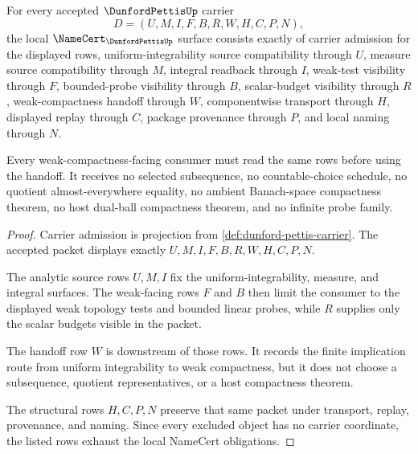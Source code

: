 \begin{theorem}
\label{thm:dunford-pettis-namecert-obligations}
For every accepted $\DunfordPettisUp$ carrier
$$
D=(U,M,I,F,B,R,W,H,C,P,N),
$$
the local $\NameCert_{\DunfordPettisUp}$ surface consists exactly of carrier admission for the displayed rows, uniform-integrability source compatibility through $U$, measure source compatibility through $M$, integral readback through $I$, weak-test visibility through $F$, bounded-probe visibility through $B$, scalar-budget visibility through $R$, weak-compactness handoff through $W$, componentwise transport through $H$, displayed replay through $C$, package provenance through $P$, and local naming through $N$.

Every weak-compactness-facing consumer must read the same rows before using the handoff. It receives no selected subsequence, no countable-choice schedule, no quotient almost-everywhere equality, no ambient Banach-space compactness theorem, no host dual-ball compactness theorem, and no infinite probe family.
\end{theorem}
\begin{proof}
Carrier admission is projection from \autoref{def:dunford-pettis-carrier}. The accepted packet displays exactly $U,M,I,F,B,R,W,H,C,P,N$.

The analytic source rows $U,M,I$ fix the uniform-integrability, measure, and integral surfaces. The weak-facing rows $F$ and $B$ then limit the consumer to the displayed weak topology tests and bounded linear probes, while $R$ supplies only the scalar budgets visible in the packet.

The handoff row $W$ is downstream of those rows. It records the finite implication route from uniform integrability to weak compactness, but it does not choose a subsequence, quotient representatives, or a host compactness theorem.

The structural rows $H,C,P,N$ preserve that same packet under transport, replay, provenance, and naming. Since every excluded object has no carrier coordinate, the listed rows exhaust the local NameCert obligations.
\end{proof}

